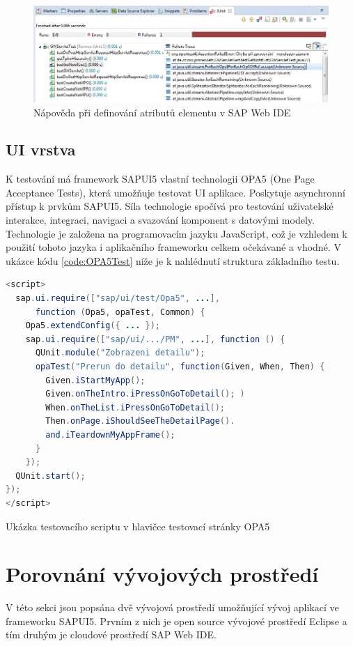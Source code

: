 \documentclass[thesis=M,czech]{FITthesis}[2012/06/26]
\begin{document}
\begin{figure}[H]
	\centering
	\includegraphics[width=1\textwidth]{images/unit_test_error}
	\caption{Nápověda při definování atributů elementu v SAP Web IDE}
	\label{img:unit_test_error}
\end{figure}

\subsection{UI vrstva}
K testování má framework SAPUI5 vlastní technologii OPA5 (One Page Acceptance Tests), která umožňuje testovat UI aplikace. Poskytuje asynchronní přístup k prvkům SAPUI5. Síla technologie spočívá pro testování uživatelské interakce, integraci, navigaci a svazování komponent s datovými modely. Technologie je založena na programovacím jazyku JavaScript, což je vzhledem k použití tohoto jazyka i aplikačního frameworku celkem očekávané a vhodné. V ukázce kódu \ref{code:OPA5Test} níže je k nahlédnutí struktura základního testu. 

\begin{algorithm}[H]
	\begin{lstlisting}[language=java]   
<script>
  sap.ui.require(["sap/ui/test/Opa5", ...], 
	  function (Opa5, opaTest, Common) {
    Opa5.extendConfig({ ... });
    sap.ui.require(["sap/ui/.../PM", ...], function () {
      QUnit.module("Zobrazeni detailu");
      opaTest("Prerun do detailu", function(Given, When, Then) {
        Given.iStartMyApp();
        Given.onTheIntro.iPressOnGoToDetail(); )
        When.onTheList.iPressOnGoToDetail();
        Then.onPage.iShouldSeeTheDetailPage().
        and.iTeardownMyAppFrame();
      }
    });
  QUnit.start();
});
</script>
	\end{lstlisting}
	\caption{Ukázka testovacího scriptu v hlavičce testovací stránky OPA5}	
	\label{code:OPA5Test}
	\small 
\end{algorithm}

\section{Porovnání vývojových prostředí}
V této sekci jsou popsána dvě vývojová prostředí umožňující vývoj aplikací ve frameworku SAPUI5. Prvním z nich je open source vývojové prostředí Eclipse a tím druhým je cloudové prostředí SAP Web IDE.  
\end{document}
